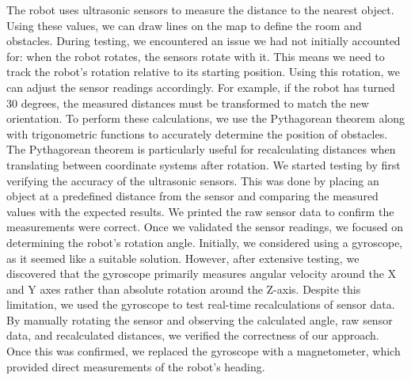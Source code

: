The robot uses ultrasonic sensors to measure the distance to the nearest object. Using these values, we can draw lines on the map to define the room and obstacles.
During testing, we encountered an issue we had not initially accounted for: when the robot rotates, the sensors rotate with it. 
This means we need to track the robot's rotation relative to its starting position. Using this rotation, we can adjust the sensor readings accordingly. 
For example, if the robot has turned 30 degrees, the measured distances must be transformed to match the new orientation.
To perform these calculations, we use the Pythagorean theorem along with trigonometric functions to accurately determine the position of obstacles. 
The Pythagorean theorem is particularly useful for recalculating distances when translating between coordinate systems after rotation.
We started testing by first verifying the accuracy of the ultrasonic sensors. This was done by placing an object at a predefined distance from the 
sensor and comparing the measured values with the expected results. We printed the raw sensor data to confirm the measurements were correct. Once we 
validated the sensor readings, we focused on determining the robot's rotation angle.
Initially, we considered using a gyroscope, as it seemed like a suitable solution. However, after extensive testing, we discovered that the gyroscope 
primarily measures angular velocity around the X and Y axes rather than absolute rotation around the Z-axis. Despite this limitation, we used the 
gyroscope to test real-time recalculations of sensor data. By manually rotating the sensor and observing the calculated angle, raw sensor data, and 
recalculated distances, we verified the correctness of our approach. Once this was confirmed, we replaced the gyroscope with a magnetometer, which 
provided direct measurements of the robot's heading.







